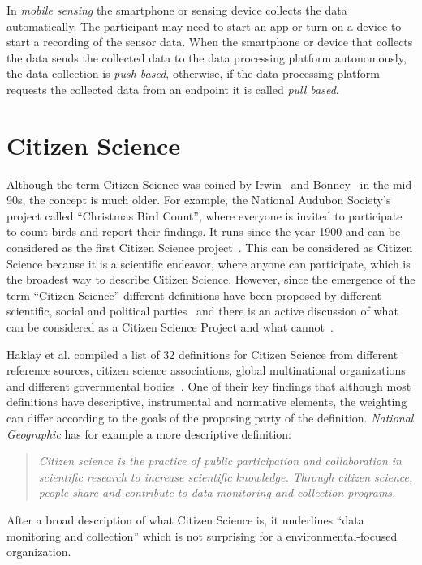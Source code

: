 In \textit{mobile sensing} the smartphone or sensing device collects the data automatically.
The participant may need to start an app or turn on a device to start a recording of the sensor data.
When the smartphone or device that collects the data sends the collected data to the data processing platform autonomously, the data collection is \textit{push based}, otherwise, if the data processing platform requests the collected data from an endpoint it is called \textit{pull based}. 

\section{Citizen Science}
\label{sec:citizen_science_background}
Although the term Citizen Science was coined by Irwin~\cite{irwin1995citizen} and Bonney~\cite{bonney1996citizen} in the mid-90s, the concept is much older.
For example, the National Audubon Society's project called ``Christmas Bird Count'', where everyone is invited to participate to count birds and report their findings.
It runs since the year 1900 and can be considered as the first Citizen Science project~\cite{silvertown2009new}.
This can be considered as Citizen Science because it is a scientific endeavor, where anyone can participate, which is the broadest way to describe Citizen Science.
However, since the emergence of the term ``Citizen Science'' different definitions have been proposed by different scientific, social and political parties~\cite{heigl2019toward,ecsa2015ten,us2016crowdsourcing} and there is an active discussion of what can be considered as a Citizen Science Project and what cannot~\cite{haklay2021citizen}. 

Haklay et al. compiled a list of 32 definitions for Citizen Science from different reference sources, citizen science associations, global multinational organizations and different governmental bodies~\cite{haklay2021citizen}.
One of their key findings that although most definitions have descriptive, instrumental and normative elements, the weighting can differ according to the goals of the proposing party of the definition.
\textit{National Geographic} has for example a more descriptive definition:
\begin{quote}
\textit{Citizen science is the practice of public participation and collaboration in scientific research to increase scientific knowledge. Through citizen science, people share and contribute to data monitoring and collection programs.}
\end{quote}
After a broad description of what Citizen Science is, it underlines ``data monitoring and collection'' which is not surprising for a environmental-focused organization.

